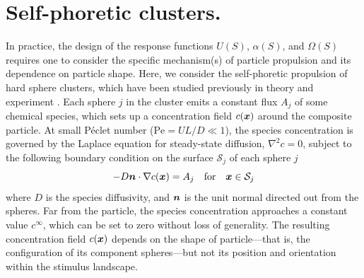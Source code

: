 \section{Self-phoretic clusters.}  
In practice, the design of the response functions $U(S)$, $\alpha(S)$, and $\Omega(S)$ requires one to consider the specific mechanism(s) of particle propulsion and its dependence on particle shape. Here, we consider the self-phoretic propulsion of hard sphere clusters, which have been studied previously in theory \cite{soto2014self, varma2018clustering} and experiment \cite{niu2018dynamics, schmidt2019light}. Each sphere $j$ in the cluster emits a constant flux $A_j$ of some chemical species, which sets up a concentration field $c(\boldsymbol{x})$ around the composite particle. At small P\'eclet number ($\text{Pe}=UL/D\ll1$), the species concentration is governed by the Laplace equation for steady-state diffusion, $\nabla^2c=0$, subject to the following boundary condition on the surface $\mathcal{S}_j$ of each sphere $j$
\begin{equation}
   -D\boldsymbol{n} \cdot \nabla c(\boldsymbol{x}) = A_j \quad \text{for} \quad \boldsymbol{x}\in \mathcal{S}_j
\end{equation}
where $D$ is the species diffusivity, and $\boldsymbol{n}$ is the unit normal directed out from the spheres.  Far from the particle, the species concentration approaches a constant value $c^{\infty}$, which can be set to zero without loss of generality. The resulting concentration field $c(\boldsymbol{x})$ depends on the shape of particle---that is, the configuration of its component spheres---but not its position and orientation within the stimulus landscape.

